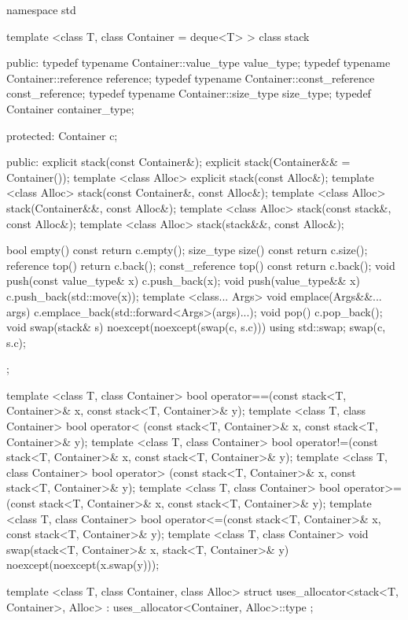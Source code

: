 \begin{codeblock}
namespace std {
  template <class T, class Container = deque<T> >
  class stack {
  public:
    typedef typename Container::value_type            value_type;
    typedef typename Container::reference             reference;
    typedef typename Container::const_reference       const_reference;
    typedef typename Container::size_type             size_type;
    typedef          Container                        container_type;

  protected:
    Container c;

  public:
    explicit stack(const Container&);
    explicit stack(Container&& = Container());
    template <class Alloc> explicit stack(const Alloc&);
    template <class Alloc> stack(const Container&, const Alloc&);
    template <class Alloc> stack(Container&&, const Alloc&);
    template <class Alloc> stack(const stack&, const Alloc&);
    template <class Alloc> stack(stack&&, const Alloc&);

    bool      empty() const             { return c.empty(); }
    size_type size()  const             { return c.size(); }
    reference         top()             { return c.back(); }
    const_reference   top() const       { return c.back(); }
    void push(const value_type& x)      { c.push_back(x); }
    void push(value_type&& x)           { c.push_back(std::move(x)); }
    template <class... Args>
      void emplace(Args&&... args)      { c.emplace_back(std::forward<Args>(args)...); }
    void pop()                          { c.pop_back(); }
    void swap(stack& s) noexcept(noexcept(swap(c, s.c)))
      { using std::swap; swap(c, s.c); }
  };

  template <class T, class Container>
    bool operator==(const stack<T, Container>& x, const stack<T, Container>& y);
  template <class T, class Container>
    bool operator< (const stack<T, Container>& x, const stack<T, Container>& y);
  template <class T, class Container>
    bool operator!=(const stack<T, Container>& x, const stack<T, Container>& y);
  template <class T, class Container>
    bool operator> (const stack<T, Container>& x, const stack<T, Container>& y);
  template <class T, class Container>
    bool operator>=(const stack<T, Container>& x, const stack<T, Container>& y);
  template <class T, class Container>
    bool operator<=(const stack<T, Container>& x, const stack<T, Container>& y);
  template <class T, class Container>
    void swap(stack<T, Container>& x, stack<T, Container>& y) noexcept(noexcept(x.swap(y)));

  template <class T, class Container, class Alloc>
    struct uses_allocator<stack<T, Container>, Alloc>
      : uses_allocator<Container, Alloc>::type { };
}
\end{codeblock}

